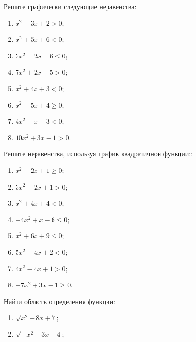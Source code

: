 \documentclass[algebra,twocolumn]{pum}
\begin{document}
\begin{exercises}
  \begin{question}
    Решите графически следующие неравенства:
    \begin{multicols}{2}
      \begin{enumerate}
        \item $x^2-3x+2>0$;
        \item $x^2+5x+6<0$;
        \item $3x^2-2x-6\le0$;
        \item $7x^2+2x-5>0$;
        \item $x^2+4x+3<0$;
        \item $x^2-5x+4\ge0$;
        \item $4x^2-x-3<0$;
        \item $10x^2+3x-1>0$.
      \end{enumerate}
    \end{multicols}
  \end{question}
  \begin{question}
    Решите неравенства, используя график квадратичной функции::
    \begin{multicols}{2}
      \begin{enumerate}
        \item $x^2-2x+1\ge0$;
        \item $3x^2-2x+1>0$;
        \item $x^2+4x+4<0$;
        \item $-4x^2+x-6\le0$;
        \item $x^2+6x+9\le0$;
        \item $5x^2-4x+2<0$;
        \item $4x^2-4x+1>0$;
        \item $-7x^2+3x-1\ge0$.
      \end{enumerate}
    \end{multicols}
  \end{question}
  \begin{question}
    Найти область определения функции:
    \begin{multicols}{2}
      \begin{enumerate}
        \item $\sqrt{x^2-8x+7}$;
        \item $\sqrt{-x^2+3x+4}$;
      \end{enumerate}
    \end{multicols}
  \end{question}

\end{exercises}
\end{document}
